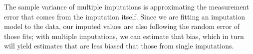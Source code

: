 \documentclass[headinclude=true, headsepline=true, DIV14]{scrartcl}\usepackage[]{graphicx}\usepackage[]{color}
\begin{document}
The sample variance of multiple imputations is approximating the measurement
error that comes from the imputation itself. Since we are fitting an imputation
model to the data, our imputed values are also following the random error of
those fits; with multiple imputations, we can estimate that bias, which in turn
will yield estimates that are less biased that those from single imputations.
  


\end{document}

